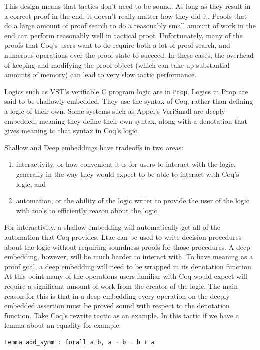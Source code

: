 \documentclass{puthesis}
\begin{document}
This design means that tactics don't need to be sound. As long as they
result in a correct proof in the end, it doesn't really matter how
they did it. Proofs that do a large amount of proof search to do a
reasonably small amount of work in the end can perform reasonably well
in tactical proof. Unfortunately, many of the proofs that Coq's users
want to do require both a lot of proof search, and numerous operations
over the proof state to succeed. In these cases, the overhead of
keeping and modifying the proof object (which can take up substantial
amounts of memory) can lead to very slow tactic performance.

Logics such as VST's verifiable C program logic are in
\lstinline|Prop|. Logics in Prop are said to be shallowly
embedded. They use the syntax of Coq, rather than defining a logic of
their own. Some systems such as Appel's VeriSmall \cite{} are deeply
embedded, meaning they define their own syntax, along with a
denotation that gives meaning to that syntax in Coq's logic. 

Shallow and Deep embeddings have tradeoffs in two areas:

\begin{enumerate}
\item interactivity, or how convenient it is for users to interact
  with the logic, generally in the way they would expect to be able to
  interact with Coq's logic, and
\item automation, or the ability of the logic writer to provide the
  user of the logic with tools to efficiently reason about the logic.
\end{enumerate}

For interactivity, a shallow embedding will automatically get all of
the automation that Coq provides. Ltac can be used to write decision
procedures about the logic without requiring soundness proofs for
those procedures. A deep embedding, however, will be much harder to
interact with. To have meaning as a proof goal, a deep embedding will
need to be wrapped in its denotation function. At this point many of
the operations users familiar with Coq would expect will require a
significant amount of work from the creator of the logic. The main
reason for this is that in a deep embedding every operation on the
deeply embedded assertion must be proved sound with respect to the
denotation function. Take Coq's rewrite tactic as an example. In this
tactic if we have a lemma about an equality for example:

\begin{verbatim}
Lemma add_symm : forall a b, a + b = b + a
\end{verbatim}
\end{document}
